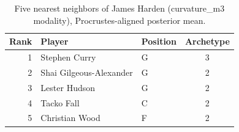 \begin{table}[htbp]
  \centering\small
  \begin{tabular}{rllc}
    \toprule
    Rank & Player & Position & Archetype \\
    \midrule
    1 & Stephen Curry & G & 3 \\
    2 & Shai Gilgeous-Alexander & G & 2 \\
    3 & Lester Hudson & G & 2 \\
    4 & Tacko Fall & C & 2 \\
    5 & Christian Wood & F & 2 \\
    \bottomrule
  \end{tabular}
  \caption{Five nearest neighbors of James Harden (curvature_m3 modality), Procrustes-aligned posterior mean.}
  \label{tab:James_Harden_neighbors_curvature_m3}
\end{table}

